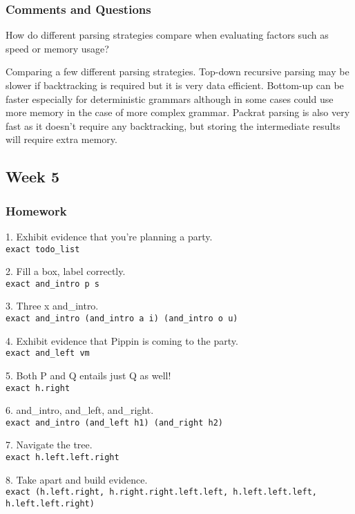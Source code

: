 \documentclass{article}
\theoremstyle{theorem}
\theoremstyle{definition}
\theoremstyle{remark}
\begin{document}
{\subsubsection*{Comments and Questions}

How do different parsing strategies compare when evaluating factors such as speed or memory usage?

Comparing a few different parsing strategies. Top-down recursive parsing may be slower if backtracking is required but it is very data efficient. Bottom-up can be faster especially for deterministic grammars although in some cases could use more memory in the case of more complex grammar. Packrat parsing is also very fast as it doesn't require any backtracking, but storing the intermediate results will require extra memory.

\subsection{Week 5}

\subsubsection*{Homework}

1. Exhibit evidence that you're planning a party.\\
\texttt{exact todo\_list}

2. Fill a box, label correctly.\\
\texttt{exact and\_intro p s}

3. Three x and\_intro.\\
\texttt{exact and\_intro (and\_intro a i) (and\_intro o u)}

4. Exhibit evidence that Pippin is coming to the party.\\
\texttt{exact and\_left vm}

5. Both P and Q entails just Q as well!\\
\texttt{exact h.right}

6. and\_intro, and\_left, and\_right.\\
\texttt{exact and\_intro (and\_left h1) (and\_right h2)}

7. Navigate the tree.\\
\texttt{exact h.left.left.right}

8. Take apart and build evidence.\\
\texttt{exact (h.left.right, h.right.right.left.left, h.left.left.left, h.left.left.right)}

}
\end{document}
